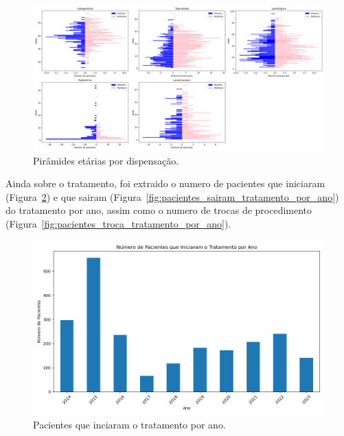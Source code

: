 \documentclass[article,a4paper,12pt,brazil,sumario=tradicional]{abntex2}
\begin{document}
\begin{figure}[!ht]
    \centering
    \includegraphics[width=1\textwidth]{grid_piramides_etarias_medicamento.png}
    \caption{Pirâmides etárias por dispensação.}
    \label{fig:grid_piramides_etarias_medicamento}
\end{figure}

Ainda sobre o tratamento, foi extraido o numero de pacientes que iniciaram (Figura~\ref{fig:pacientes_iniciaram_tratamento_por_ano}) e que sairam (Figura~\ref{fig:pacientes_sairam_tratamento_por_ano}) do tratamento por ano, assim como o numero de trocas de procedimento (Figura~\ref{fig:pacientes_troca_tratamento_por_ano}).

\begin{figure}[!ht]
    \centering
    \includegraphics[width=1\textwidth]{pacientes_iniciaram_tratamento_por_ano.png}
    \caption{Pacientes que inciaram o tratamento por ano.}
    \label{fig:pacientes_iniciaram_tratamento_por_ano}
\end{figure}
\end{document}
